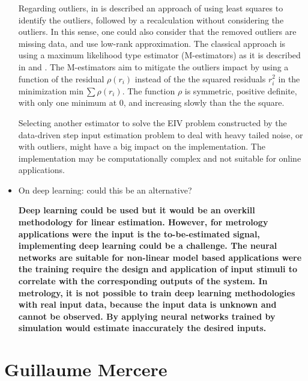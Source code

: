 \documentclass[11pt]{article}
\begin{document}
\begin{itemize}
{	Regarding outliers, in \cite{Maronna06} is described an approach of using least squares to identify the outliers, followed by a recalculation without considering the outliers. In this sense, one could also consider that the removed outliers are missing data, and use low-rank approximation. The classical approach is using a maximum likelihood type estimator (M-estimators) as it is described in \cite{Zhang97} and \cite{Huber81}. The M-estimators aim to mitigate the outliers impact by using a function of the residual $\rho(r_i)$ instead of the the squared residuals $r_i^2$ in the minimization $\text{min} \ \sum{\rho(r_i)}$. The function $\rho$ is symmetric, positive definite, with only one minimum at 0, and increasing slowly than the the square.  
	
	Selecting another estimator to solve the EIV problem constructed by the data-driven step input estimation problem to deal with heavy tailed noise, or with outliers, might have a big impact on the implementation. The implementation may be computationally complex and not suitable for online applications.  

	
	
	
	}
	
	\item  On deep learning: could this be an alternative?
	
	{\bfseries Deep learning could be used but it would be an overkill methodology for linear estimation. However, for metrology applications were the input is the to-be-estimated signal, implementing deep learning could be a challenge. The neural networks are suitable for non-linear model based applications were the training require the design and application of input stimuli to correlate with the corresponding outputs of the system. 
	In metrology, it is not possible to train deep learning methodologies with real input data, because the input data is unknown and cannot be observed. 
	By applying neural networks trained by simulation would estimate inaccurately the desired inputs.  }
	
	
\end{itemize}

\section*{Guillaume Mercere}
\end{document}
